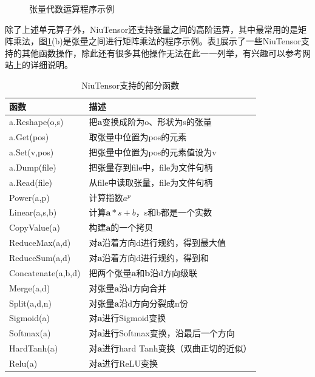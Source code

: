 \begin{figure}[htp]
\centering

\caption{ 张量代数运算程序示例}
\label{fig:5-35}
\end{figure}

\parinterval 除了上述单元算子外，NiuTensor还支持张量之间的高阶运算，其中最常用的是矩阵乘法，图\ref{fig:5-35}(b)是张量之间进行矩阵乘法的程序示例。表\ref{tab:5-2}展示了一些NiuTensor支持的其他函数操作，除此还有很多其他操作无法在此一一列举，有兴趣可以参考网站上的详细说明。
\begin{table}[htp]
\centering
\caption{NiuTensor支持的部分函数}
\label{tab:5-2}
\small
\begin{tabular}{l | l}
\rule{0pt}{15pt}     函数 & 描述  \\
\hline
\rule{0pt}{15pt}     a.Reshape(o,s) & 把$ \mathbf a $变换成阶为o、形状为s的张量  \\
\rule{0pt}{15pt}     a.Get(pos) & 取张量中位置为pos的元素  \\
\rule{0pt}{15pt}     a.Set(v,pos) & 把张量中位置为pos的元素值设为v  \\
\rule{0pt}{15pt}     a.Dump(file) & 把张量存到file中，file为文件句柄  \\
\rule{0pt}{15pt}     a.Read(file) & 从file中读取张量，file为文件句柄  \\
\rule{0pt}{15pt}     Power(a,p) & 计算指数$ a^p $  \\
\rule{0pt}{15pt}     Linear(a,s,b) & 计算$ \mathbf a\ast s+b $，s和b都是一个实数  \\
\rule{0pt}{15pt}     CopyValue(a) & 构建$ \mathbf a $的一个拷贝  \\
\rule{0pt}{15pt}     ReduceMax(a,d) & 对$ \mathbf a $沿着方向d进行规约，得到最大值  \\
\rule{0pt}{15pt}     ReduceSum(a,d) & 对$ \mathbf a $沿着方向d进行规约，得到和  \\
\rule{0pt}{15pt}     Concatenate(a,b,d) & 把两个张量$ \mathbf a $和$ \mathbf b $沿d方向级联  \\
\rule{0pt}{15pt}     Merge(a,d) & 对张量$ \mathbf a $沿d方向合并  \\
\rule{0pt}{15pt}     Split(a,d,n) & 对张量$ \mathbf a $沿d方向分裂成n份  \\
\rule{0pt}{15pt}     Sigmoid(a) & 对$ \mathbf a $进行Sigmoid变换  \\
\rule{0pt}{15pt}     Softmax(a) & 对$ \mathbf a $进行Softmax变换，沿最后一个方向  \\
\rule{0pt}{15pt}     HardTanh(a) & 对$ \mathbf a $进行hard Tanh变换（双曲正切的近似）  \\
\rule{0pt}{15pt}     Relu(a) & 对$ \mathbf a $进行ReLU变换  \\
\end{tabular}
\end{table}

